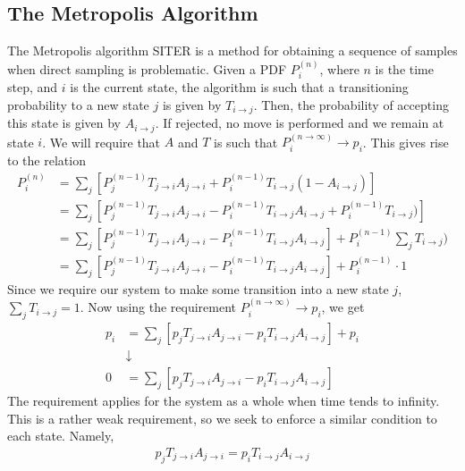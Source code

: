 \documentclass[11pt]{article}
\newcommand{\husk}[1]{\color{red} #1 \color{black}}
\begin{document}
\subsection{The Metropolis Algorithm}
The Metropolis algorithm \husk{SITER} is a method for obtaining a sequence of samples when direct sampling is problematic. Given a PDF $P^{(n)}_i$, where $n$ is the time step, and $i$ is the current state, the algorithm is such that a transitioning probability to a new state $j$ is given by $T_{i\rightarrow j}$. Then, the probability of accepting this state is given by $A_{i\rightarrow j}$. If rejected, no move is performed and we remain at state $i$. We will require that $A$ and $T$ is such that $P^{(n\rightarrow \infty)}_i\rightarrow p_i$. This gives rise to the relation
\begin{align*}
	P^{(n)}_i &= \sum_j \left[ P^{(n-1)}_j T_{j\rightarrow i} A_{j\rightarrow i} + P^{(n-1)}_i T_{i\rightarrow j} (1 - A_{i\rightarrow j}) \right] \\
	&= \sum_j \left[ P^{(n-1)}_j T_{j\rightarrow i} A_{j\rightarrow i} - P^{(n-1)}_i T_{i\rightarrow j} A_{i\rightarrow j} + P^{(n-1)}_i T_{i\rightarrow j}) \right] \\
	&= \sum_j \left[ P^{(n-1)}_j T_{j\rightarrow i} A_{j\rightarrow i} - P^{(n-1)}_i T_{i\rightarrow j} A_{i\rightarrow j} \right] + P^{(n-1)}_i \sum_j T_{i\rightarrow j}) \\
	&= \sum_j \left[ P^{(n-1)}_j T_{j\rightarrow i} A_{j\rightarrow i} - P^{(n-1)}_i T_{i\rightarrow j} A_{i\rightarrow j} \right] + P^{(n-1)}_i \cdot 1
\end{align*}
Since we require our system to make some transition into a new state $j$, $\sum_j T_{i\rightarrow j} = 1$. Now using the requirement $P^{(n\rightarrow \infty)}_i\rightarrow p_i$, we get 
\begin{align*}
	p_i &= \sum_j \left[ p_j T_{j\rightarrow i} A_{j\rightarrow i} - p_i T_{i\rightarrow j} A_{i\rightarrow j} \right] + p_i \\
	&\downarrow \\
	0 &= \sum_j \left[p_j T_{j\rightarrow i} A_{j\rightarrow i} - p_i T_{i\rightarrow j} A_{i\rightarrow j} \right]
\end{align*}
The requirement applies for the system as a whole when time tends to infinity. This is a rather weak requirement, so we seek to enforce a similar condition to each state. Namely,
\begin{align*}
	p_j T_{j\rightarrow i} A_{j\rightarrow i} = p_i T_{i\rightarrow j} A_{i\rightarrow j}
\end{align*}
\end{document}
